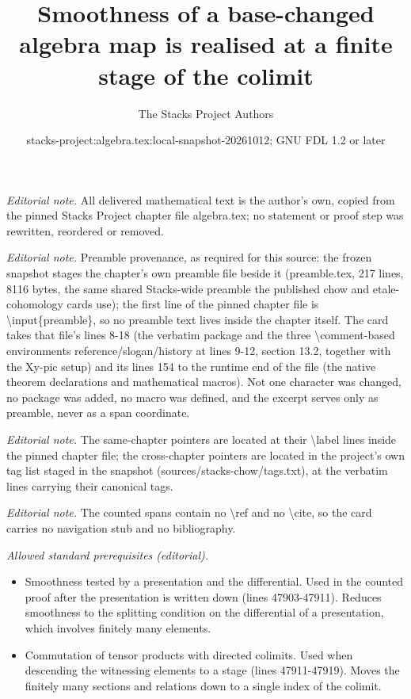 \documentclass[10pt,a4paper]{amsart}
\title{Smoothness of a base-changed algebra map is realised at a finite stage of the colimit}
\author{The Stacks Project Authors}
\date{stacks-project:algebra.tex:local-snapshot-20261012; GNU FDL 1.2 or later}
\theoremstyle{plain}
\theoremstyle{definition}
\theoremstyle{remark}
\numberwithin{equation}{subsection}
\begin{document}
\maketitle
\noindent\textit{Editorial note.} All delivered mathematical text is the author's own, copied from the pinned Stacks Project chapter file algebra.tex; no statement or proof step was rewritten, reordered or removed.\par\medskip
\noindent\textit{Editorial note.} Preamble provenance, as required for this source: the frozen snapshot stages the chapter's own preamble file beside it (preamble.tex, 217 lines, 8116 bytes, the same shared Stacks-wide preamble the published chow and etale-cohomology cards use); the first line of the pinned chapter file is \textbackslash{}input\{preamble\}, so no preamble text lives inside the chapter itself. The card takes that file's lines 8-18 (the verbatim package and the three \textbackslash{}comment-based environments reference/slogan/history at lines 9-12, section 13.2, together with the Xy-pic setup) and its lines 154 to the runtime end of the file (the native theorem declarations and mathematical macros). Not one character was changed, no package was added, no macro was defined, and the excerpt serves only as preamble, never as a span coordinate.\par\medskip
\noindent\textit{Editorial note.} The same-chapter pointers are located at their \textbackslash{}label lines inside the pinned chapter file; the cross-chapter pointers are located in the project's own tag list staged in the snapshot (sources/stacks-chow/tags.txt), at the verbatim lines carrying their canonical tags.\par\medskip
\noindent\textit{Editorial note.} The counted spans contain no \textbackslash{}ref and no \textbackslash{}cite, so the card carries no navigation stub and no bibliography.\par\medskip
\noindent\textit{Allowed standard prerequisites (editorial).}\begin{itemize}
\item Smoothness tested by a presentation and the differential. Used in the counted proof after the presentation is written down (lines 47903-47911). Reduces smoothness to the splitting condition on the differential of a presentation, which involves finitely many elements.
\item Commutation of tensor products with directed colimits. Used when descending the witnessing elements to a stage (lines 47911-47919). Moves the finitely many sections and relations down to a single index of the colimit.
\end{itemize}\medskip
\end{document}
